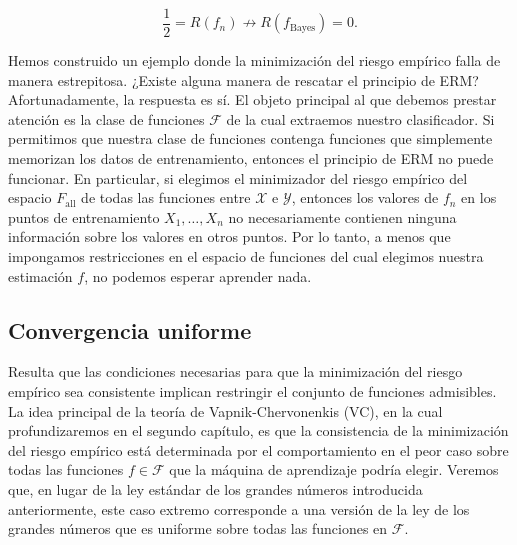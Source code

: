 \documentclass{report}
\begin{document}
\[
\frac{1}{2} = R(f_n) \not\to R(f_{\text{Bayes}}) = 0.
\]

Hemos construido un ejemplo donde la minimización del riesgo empírico falla de manera estrepitosa. ¿Existe 
alguna manera de rescatar el principio de ERM? Afortunadamente, la respuesta es sí. El objeto principal al 
que debemos prestar atención es la clase de funciones \(\mathcal{F}\) de la cual extraemos nuestro clasificador. Si 
permitimos que nuestra clase de funciones contenga funciones que simplemente memorizan los datos de 
entrenamiento, entonces el principio de ERM no puede funcionar. En particular, si elegimos el minimizador 
del riesgo empírico del espacio \(F_{\text{all}}\) de todas las funciones entre \(\mathcal{X}\) e \(\mathcal{Y}\), entonces los 
valores de \(f_n\) en los puntos de entrenamiento \(X_1, \dots, X_n\) no necesariamente contienen ninguna 
información sobre los valores en otros puntos. Por lo tanto, a menos que impongamos restricciones en el 
espacio de funciones del cual elegimos nuestra estimación \(f\), no podemos esperar aprender nada.\newline


\subsection{Convergencia uniforme}

Resulta que las condiciones necesarias para que la minimización del riesgo empírico sea consistente 
implican restringir el conjunto de funciones admisibles. La idea principal de la teoría de Vapnik-Chervonenkis 
(VC), en la cual profundizaremos en el segundo capítulo, es que la consistencia de la minimización del riesgo empírico está determinada por el comportamiento 
en el peor caso sobre todas las funciones \(f \in \mathcal{F}\) que la máquina de aprendizaje podría elegir. Veremos que, 
en lugar de la ley estándar de los grandes números introducida anteriormente, este caso extremo corresponde 
a una versión de la ley de los grandes números que es uniforme sobre todas las funciones en \(\mathcal{F}\).
\end{document}
